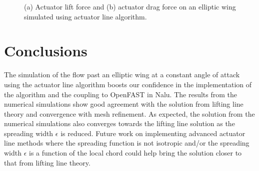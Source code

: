 \documentclass{jfm}
\begin{document}
\begin{figure}
  \hfill
  \caption{(a) Actuator lift force and (b) actuator drag force on an elliptic wing simulated using actuator line algorithm.}
\label{fig:act_l_act_d}
\end{figure}

\section{Conclusions}

The simulation of the flow past an elliptic wing at a constant angle
of attack using the actuator line algorithm boosts our confidence in
the implementation of the algorithm and the coupling to OpenFAST in
Nalu. The results from the numerical simulations show good agreement
with the solution from lifting line theory and convergence with mesh
refinement. As expected, the solution from the numerical simulations
also converges towards the lifting line solution as the spreading
width $\epsilon$ is reduced. Future work on implementing advanced
actuator line methods where the spreading function is not isotropic
and/or the spreading width $\epsilon$ is a function of the local chord
could help bring the solution closer to that from lifting line theory.



\end{document}
